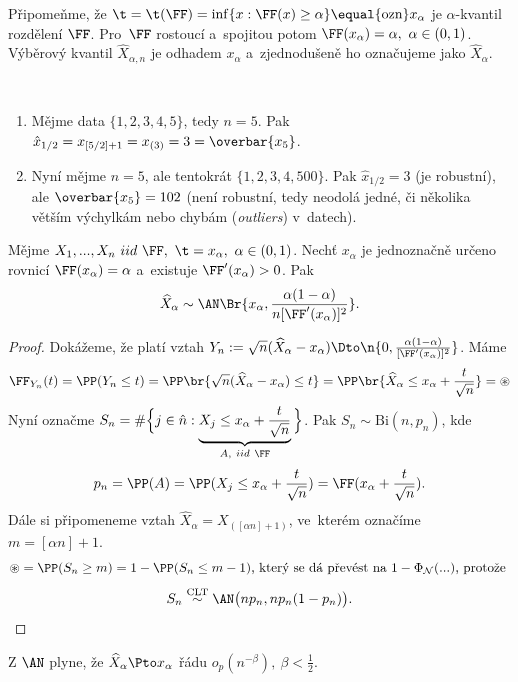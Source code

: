 \begin{remark}Připomeňme, že
	$\t=\t(\FF)=\inf\{ x:\FF(x)\geq \alpha \}\equal{\text{ozn}}x_\alpha$ je $\alpha$-kvantil rozdělení $\FF$. Pro~$\FF$ rostoucí a~spojitou potom $\FF(x_\alpha)=\alpha,~\alpha\in(0,1)$. Výběrový kvantil $\widehat{X}_{\alpha,n}$ je odhadem $x_\alpha$ a~zjednodušeně ho označujeme jako $\widehat{X}_\alpha$.
\end{remark}
\begin{example}~
		\begin{enumerate}
		\item Mějme data $\{1,2,3,4,5\}$, tedy $n=5$. Pak $\hat{x}_{1/2}=x_{[5/2]+1}=x_{(3)}=3=\overbar{\rule{0ex}{1.33ex}x_5}$.
		\item Nyní mějme $n=5$, ale tentokrát $\{1,2,3,4,500\}$. Pak $\hat{x}_{1/2}=3$ (je robustní), ale $\overbar{\rule{0ex}{1.33ex}x_5}=102$ (není robustní, tedy neodolá jedné, či několika větším výchylkám nebo chybám (\textit{outliers}) v~datech).
	\end{enumerate}
\end{example}
\begin{theorem}
	Mějme $X_1,...,X_n~iid~\FF,~\t=x_\alpha,~\alpha\in(0,1)$. Nechť $x_\alpha$ je jednoznačně určeno rovnicí $\FF(x_\alpha)=\alpha$ a~existuje $\FF'(x_\alpha)>0$. Pak $$\widehat{X}_\alpha\sim\AN\Br{x_\alpha,\frac{\alpha(1-\alpha)}{n[\FF'(x_\alpha)]^2}}.$$
	\begin{proof} Dokážeme, že platí vztah
		$Y_n:=\sqrt{n}(\widehat{X}_\alpha-x_\alpha)\Dto\n{0,\frac{\alpha(1-\alpha)}{[\FF'(x_\alpha)]^2}}$. Máme
		\[
		\begin{split}
		\FF_{Y_n}(t)=\PP(Y_n\leq t)=\PP\br{\sqrt{n}(\widehat{X}_\alpha-x_\alpha)\leq t}=\PP\br{\widehat{X}_\alpha\leq x_\alpha+\frac{t}{\sqrt{n}}}=\circledast
		\end{split}
		\]
		Nyní označme $S_n=\#\Big\{ j\in\hat{n}:\underbrace{X_j\leq x_\alpha+\frac{t}{\sqrt{n}}}_{A,~iid~\FF} \Big\}$. Pak $S_n\sim\mathrm{Bi}(n,p_n)$, kde 
		$$p_n=\PP(A)=\PP(X_j\leq x_\alpha+\frac{t}{\sqrt{n}})=\FF(x_\alpha+\frac{t}{\sqrt{n}}).$$  Dále si připomeneme vztah $\widehat{X}_\alpha=X_{([\alpha n]+1)}$, ve~kterém označíme $m=[\alpha n]+1$.\newline
		$$ \circledast = \PP(S_n\geq m)=1-\PP(S_n\leq m-1)\text{, který se~dá převést na~}1-\Phi_\mathcal{N}(...)\text{, protože }$$
		$$S_n\stackrel{\text{CLT}}{\sim}\AN\big(np_n,np_n(1-p_n)\big).$$
	\end{proof}
\end{theorem}
\begin{dusl}
	Z $\AN$ plyne, že $\widehat{X}_\alpha\Pto x_\alpha$ řádu $o_p(n^{-\beta}),~\beta<\frac{1}{2}$.
\end{dusl}

